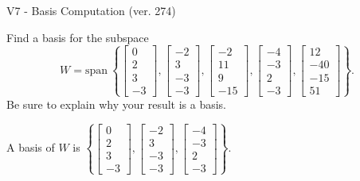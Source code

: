 \begin{exercise}
  \begin{exerciseTitle}V7 - Basis Computation (ver. 274)\end{exerciseTitle}
  \begin{exerciseStatement}
    Find a basis for the subspace 
\[W=\mathrm{span}\ \left\{\left[\begin{array}{r}
0 \\
2 \\
3 \\
-3
\end{array}\right] , \left[\begin{array}{r}
-2 \\
3 \\
-3 \\
-3
\end{array}\right] , \left[\begin{array}{r}
-2 \\
11 \\
9 \\
-15
\end{array}\right] , \left[\begin{array}{r}
-4 \\
-3 \\
2 \\
-3
\end{array}\right] , \left[\begin{array}{r}
12 \\
-40 \\
-15 \\
51
\end{array}\right]\right\}.\]
 Be sure to explain why your result is a basis.


  \end{exerciseStatement}
  \begin{exerciseAnswer}
   A basis of \(W\) is  \(\left\{\left[\begin{array}{r}
0 \\
2 \\
3 \\
-3
\end{array}\right] , \left[\begin{array}{r}
-2 \\
3 \\
-3 \\
-3
\end{array}\right] , \left[\begin{array}{r}
-4 \\
-3 \\
2 \\
-3
\end{array}\right]\right\}\).
  


  \end{exerciseAnswer}
\end{exercise}